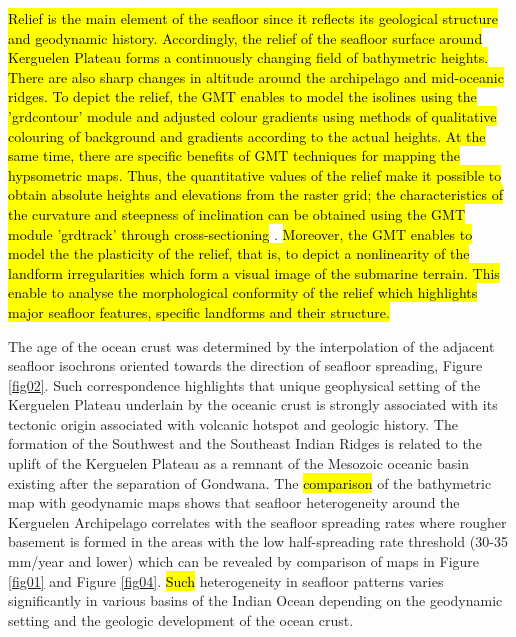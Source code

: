\documentclass[geomatics,article,submit,pdftex,moreauthors]{Definitions/mdpi}
\begin{document}
\hl{Relief is the main element of the seafloor since it reflects its geological structure and geodynamic history. Accordingly, the relief of the seafloor surface around Kerguelen Plateau forms a continuously changing field of bathymetric heights. There are also sharp changes in altitude around the archipelago and mid-oceanic ridges. To depict the relief, the GMT enables to model the isolines using the 'grdcontour' module and adjusted colour gradients using methods of qualitative colouring of background and gradients according to the actual heights. At the same time, there are specific benefits of GMT techniques for mapping the hypsometric maps. Thus, the quantitative values of the relief make it possible to obtain absolute heights and elevations from the raster grid; the characteristics of the curvature and steepness of inclination can be obtained using the GMT module 'grdtrack' through cross-sectioning} \cite{Lemenkova202213,Lemenkova202018,Lemenkova202017}. \hl{Moreover, the GMT enables to model the the plasticity of the relief, that is, to depict a nonlinearity of the landform irregularities which form a visual image of the submarine terrain. This enable to analyse the morphological conformity of the relief which highlights major seafloor features, specific landforms and their structure.} 

The age of the ocean crust was determined by the interpolation of the adjacent seafloor isochrons oriented towards the direction of seafloor spreading, Figure \ref{fig02}. Such correspondence highlights that unique geophysical setting of the Kerguelen Plateau underlain by the oceanic crust is strongly associated with its tectonic origin associated with volcanic hotspot and geologic history. The formation of the Southwest and the Southeast Indian Ridges is related to the uplift of the Kerguelen Plateau as a remnant of the Mesozoic oceanic basin existing after the separation of Gondwana. The \hl{comparison} of the bathymetric map with geodynamic maps shows that seafloor heterogeneity around the Kerguelen Archipelago correlates with the seafloor spreading rates where rougher basement is formed in the areas with the low half-spreading rate threshold (30-35 mm/year and lower) which can be revealed by comparison of maps in Figure \ref{fig01} and Figure \ref{fig04}. \hl{Such} heterogeneity in seafloor patterns varies significantly in various basins of the Indian Ocean depending on the geodynamic setting and the geologic development of the ocean crust.
\end{document}
